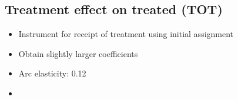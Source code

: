 \documentclass[12pt]{article}
\begin{document}
\subsection{Treatment effect on treated (TOT)}
\begin{itemize}
    \item Instrument for receipt of treatment using initial assignment
    \item Obtain slightly larger coefficients
    \item Arc elasticity: 0.12
    \item {}
\end{itemize}
\end{document}
